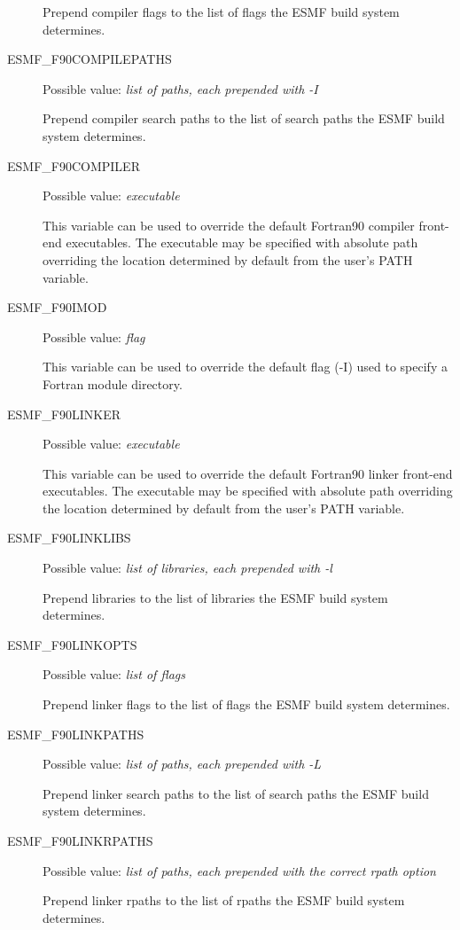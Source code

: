 \begin{description}
Prepend compiler flags to the list of flags the ESMF build system determines.

\item[ESMF\_F90COMPILEPATHS]
Possible value: {\em list of paths, each prepended with -I}

Prepend compiler search paths to the list of search paths the ESMF build system
determines.

\item[ESMF\_F90COMPILER]
Possible value: {\em executable}

This variable can be used to override the default Fortran90 compiler
front-end executables. The executable may be specified with absolute path
overriding the location determined by default from the user's PATH variable.

\item[ESMF\_F90IMOD]
Possible value: {\em flag}

This variable can be used to override the default flag (-I) used to specify a
Fortran module directory.

\item[ESMF\_F90LINKER]
Possible value: {\em executable}

This variable can be used to override the default Fortran90 linker
front-end executables. The executable may be specified with absolute path
overriding the location determined by default from the user's PATH variable.

\item[ESMF\_F90LINKLIBS]
Possible value: {\em list of libraries, each prepended with -l}

Prepend libraries to the list of libraries the ESMF build system determines.

\item[ESMF\_F90LINKOPTS]
Possible value: {\em list of flags}

Prepend linker flags to the list of flags the ESMF build system determines.

\item[ESMF\_F90LINKPATHS]
Possible value: {\em list of paths, each prepended with -L}

Prepend linker search paths to the list of search paths the ESMF build system
determines.

\item[ESMF\_F90LINKRPATHS]
Possible value: {\em list of paths, each prepended with the correct rpath option}

Prepend linker rpaths to the list of rpaths the ESMF build system determines.


\end{description}
